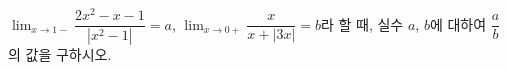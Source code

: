 $\displaystyle\lim_{x\to 1-}\dfrac{2x^2-x-1}{|x^2-1|}=a$, $\displaystyle\lim_{x\to 0+}\dfrac{x}{x+|3x|}=b$라 할 때, 실수 $a$, $b$에 대하여 $\dfrac{a}{b}$의 값을 구하시오.
